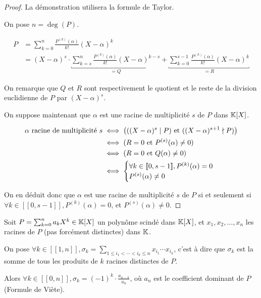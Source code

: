 \documentclass[12pt,a4paper]{report}
\begin{document}
\begin{proof}
    La démonstration utilisera la formule de Taylor.

    On pose $n = \deg(P)$.

    \begin{align*}
        P &= \sum_{k=0}^{n} \frac{P^{(k)}(\alpha)}{k!} (X-\alpha)^k\\
        &= (X-\alpha)^s \cdot \underbracket{\sum_{k=s}^{n} \frac{P^{(k)}(\alpha)}{k!} (X-\alpha)^{k-s}}_{=Q} + \underbracket{\sum_{k=0}^{s-1} \frac{P^{(k)}(\alpha)}{k!} (X-\alpha)^k}_{=R}
    \end{align*}

    On remarque que $Q$ et $R$ sont respectivement le quotient et le reste de la division euclidienne de $P$ par $(X-\alpha)^s$.

    On suppose maintenant que $\alpha$ est une racine de multiplicité $s$ de $P$ dans $\mathbb{K}[X]$.

    \begin{align*}
        \alpha \text{ racine de multiplicité } s &\iff \big(((X-\alpha)^s \mid P) \text{ et } ((X-\alpha)^{s+1} \nmid P)\big)\\
        &\iff (R=0 \text{ et } P^{(s)}(\alpha) \ne 0)\\
        &\iff (R=0 \text{ et } Q(\alpha) \ne 0)\\
        &\iff \begin{cases}
        \forall k \in [\![0,s-1]\!], P^{(k)}(\alpha) = 0\\
        P^{(s)}(\alpha) \ne 0
        \end{cases}
    \end{align*}

    On en déduit donc que $\alpha$ est une racine de multiplicité $s$ de $P$ si et seulement si $\forall k \in [\![0,s-1]\!], P^{(k)}(\alpha) = 0$, et $P^{(s)}(\alpha) \ne 0$.
\end{proof}

\begin{property}
    Soit $P = \sum_{k=0}^{n}a_kX^k \in \mathbb{K}[X]$ un polynôme scindé dans $\mathbb{K}[X]$, et $x_1, x_2, \ldots, x_n$ les racines de $P$ (pas forcément distinctes) dans $\mathbb{K}$.

    On pose $\forall k \in [\![1,n]\!], \sigma_k = \sum_{1 \le i_1 < \cdots < i_k \le n} x_{i_1} \cdots x_{i_k}$, c'est à dire que $\sigma_k$ est la somme de tous les produits de $k$ racines distinctes de $P$.

    Alors $\forall k \in [\![0,n]\!], \sigma_k = (-1)^k \cdot \frac{a_{n-k}}{a_n}$, où $a_n$ est le coefficient dominant de $P$ (Formule de Viète).
\end{property}
\end{document}
